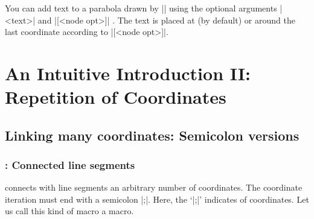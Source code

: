 \begin{tzcode}{.3}
\end{tzcode}


\subsection{\protect\cmd{\tzparabola}}
\label{ssi:texttotzparabola}

You can add text to a parabola drawn by |\tzparabola| using the optional arguments |{<text>}| and |[<node opt>]| .
The text is placed at (by default) or around the last coordinate according to |[<node opt>]|.


\begin{tzcode}{.3}
\end{tzcode}


\chapter{An Intuitive Introduction II: Repetition of Coordinates}
\label{ci:introII}

\section{Linking many coordinates: Semicolon versions}
\label{si:liknmanycoordinates}

\subsection{\protect\cmd{\tzlines}: Connected line segments}
\label{ssi:tzlines}

\icmd{\tzlines} connects with line segments an arbitrary number of coordinates. The coordinate iteration must end with a semicolon |;|.
Here, the  `|;|' indicates  of coordinates.
Let us call this kind of macro a  macro. 

